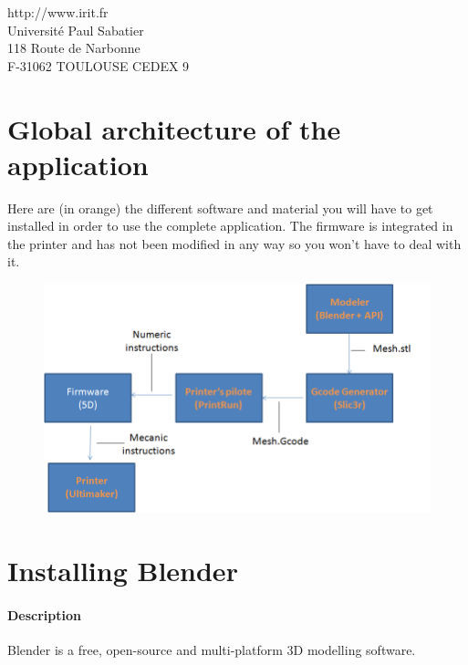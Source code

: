 \documentclass{article}
\begin{document}
\begin{center}
http://www.irit.fr\\
Université Paul Sabatier \\
118 Route de Narbonne \\
F-31062 TOULOUSE CEDEX 9
\end{center}

\thispagestyle{empty}

\newpage

\tableofcontents

\newpage

\section{Global architecture of the application}

Here are (in orange) the different software and material you will have to get installed in order to use the complete application. The firmware is integrated in the printer and has not been modified in any way so you won't have to deal with it.

\begin{figure}[!h]
\begin{center}
	\includegraphics[scale=0.4]{ARD1}
\end{center}
\end{figure}

\newpage

\section{Installing Blender}

	\paragraph{Description} Blender is a free, open-source and multi-platform 3D modelling software.
\end{document}
